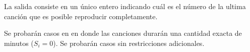 \documentclass{oci}
\begin{document}
\begin{outputDescription}
  La salida consiste en un único entero indicando cuál es el número 
de la ultima canción que es posible reproducir completamente.
\end{outputDescription}

\begin{scoreDescription}
   Se probarán casos en en donde las canciones durarán una cantidad
  exacta de minutos ($S_i = 0$).
   Se probarán casos sin restricciones adicionales. 
\end{scoreDescription}

\begin{sampleDescription}
\end{sampleDescription}
\end{document}
